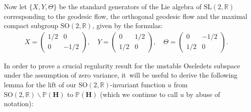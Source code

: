 \documentclass[JEP,XML,SOM,Unicode,published]{cedram}
\theoremstyle{plain}
\theoremstyle{definition}
\numberwithin{equation}{subsection}
\newcommand\bP{\mathbb{P}}
\newcommand\bR{\mathbb{R}}\let\R\bR
\newcommand{\SL}{\mathrm{SL}}
\newcommand{\SO}{\mathrm{SO}}
\newcommand{\bfH}{\boldsymbol{H}}
\begin{document}
Now let $\{X,Y, \Theta\}$ be the standard generators of the Lie algebra of $\SL(2, \R)$ corresponding to the geodesic flow, the orthogonal geodesic flow and the maximal compact subgroup
$\SO(2, \R)$, given by the formulas:
\begin{align*}X=\begin{pmatrix} 1/2&0\\ 0&-1/2 \end{pmatrix}, \quad Y=\begin{pmatrix} 0&1/2\\ 1/2&0 \end{pmatrix}, \quad \Theta=\begin{pmatrix} 0&-1/2\\ 1/2&0 \end{pmatrix}.
\end{align*}

In order to prove a crucial regularity result for the unstable Oseledets subspace under the assumption of zero variance, it~will be useful to derive the following lemma for the lift of our $\SO(2,\bR)$-invariant function $u$ from $\SO(2,\bR)\backslash \bP(\bfH)$ to $\bP(\bfH)$ (which we continue to call $u$ by abuse of notation):
\end{document}
